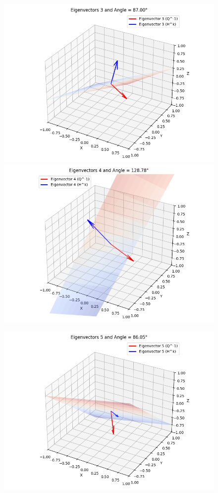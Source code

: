 \documentclass{article}
\begin{document}
\begin{figure}[H]
    \centering
\includegraphics[width=1\textwidth]{eigenvector_pair_3.png}
\includegraphics[width=1\textwidth]{eigenvector_pair_4.png}
\end{figure}

\begin{figure}[H]
    \centering
    \includegraphics[width=1\textwidth]{eigenvector_pair_5.png}
\end{figure}
\end{document}
